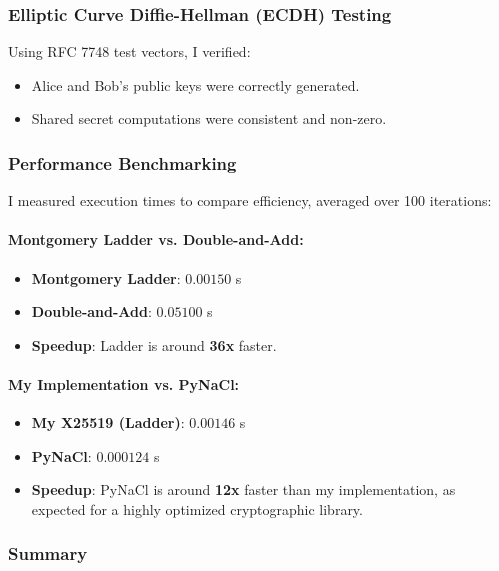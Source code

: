 \documentclass[twoside,a4paper,12pt]{article}
\begin{document}
\subsubsection{Elliptic Curve Diffie-Hellman (ECDH) Testing}

Using RFC 7748 test vectors, I verified:
\begin{itemize}
    \item Alice and Bob's public keys were correctly generated.
    \item Shared secret computations were consistent and non-zero.
\end{itemize}

\subsubsection{Performance Benchmarking}

I measured execution times to compare efficiency, averaged over 100 iterations:

\paragraph{Montgomery Ladder vs. Double-and-Add:}
\begin{itemize}
    \item \textbf{Montgomery Ladder}: \( 0.00150 \) s
    \item \textbf{Double-and-Add}: \( 0.05100 \) s
    \item \textbf{Speedup}: Ladder is around \textbf{36x} faster.
\end{itemize}

\paragraph{My Implementation vs. PyNaCl:}
\begin{itemize}
    \item \textbf{My X25519 (Ladder)}: \( 0.00146 \) s
    \item \textbf{PyNaCl}: \( 0.000124 \) s
    \item \textbf{Speedup}: PyNaCl is around \textbf{12x} faster than my implementation, as expected for a highly optimized cryptographic library.
\end{itemize}

\subsubsection{Summary}
\end{document}
